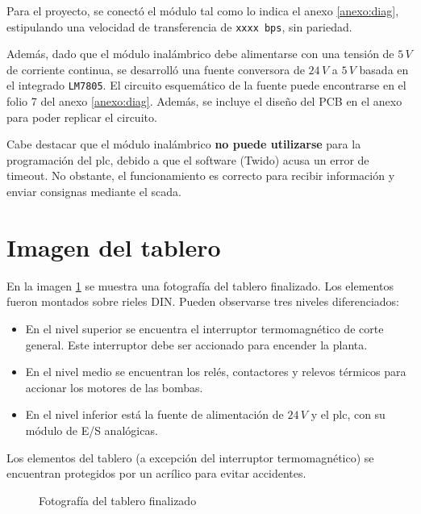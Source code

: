 Para el proyecto, se conectó el módulo tal como lo indica el 
anexo \ref{anexo:diag}, estipulando una velocidad de transferencia de 
\verb|xxxx bps|, sin pariedad.

Además, dado que el módulo inalámbrico debe alimentarse con una tensión de 
$5\,V$ de corriente continua, se desarrolló una fuente conversora de $24\,V$ a 
$5\,V$ basada en el integrado \verb|LM7805|. El circuito esquemático de la 
fuente puede encontrarse en el folio 7 del anexo \ref{anexo:diag}. Además, se 
incluye el diseño del PCB en el anexo  para poder replicar el 
circuito.

Cabe destacar que el módulo inalámbrico \textbf{no puede utilizarse} para 
la programación del \gls{plc}, debido a que el software (Twido) acusa un error 
de timeout. No obstante, el funcionamiento es correcto para recibir información 
y enviar consignas mediante el \gls{scada}.

\section{Imagen del tablero}
En la imagen \ref{fig:fotoTablero} se muestra 
una fotografía del tablero finalizado. Los elementos fueron montados sobre 
rieles DIN. Pueden observarse tres niveles diferenciados:
\begin{itemize}
 \item En el nivel superior se encuentra el interruptor termomagnético de corte 
general. Este interruptor debe ser accionado para encender la planta.
\item En el nivel medio se encuentran los relés, contactores y relevos térmicos 
para accionar los motores de las bombas.
\item En el nivel inferior está la fuente de alimentación de $24\,V$ y el 
\gls{plc}, con su módulo de E/S analógicas.
\end{itemize}
Los elementos del tablero (a excepción del interruptor termomagnético) se 
encuentran protegidos por un acrílico para evitar accidentes.

\begin{figure}[ht]
 \centering
 \caption{Fotografía del tablero finalizado}
 \label{fig:fotoTablero}
\end{figure}
